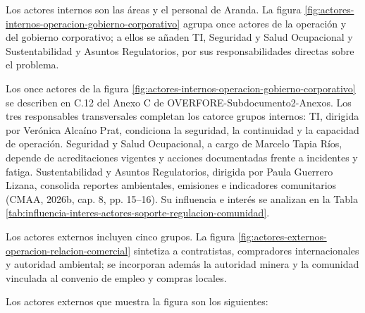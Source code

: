 \documentclass[subdoc]{../../comun/overfore}
\begin{document}
Los actores internos son las áreas y el personal de Aranda. La figura \ref{fig:actores-internos-operacion-gobierno-corporativo} agrupa once actores de la operación y del gobierno corporativo; a ellos se añaden TI, Seguridad y Salud Ocupacional y Sustentabilidad y Asuntos Regulatorios, por sus responsabilidades directas sobre el problema.

Los once actores de la figura \ref{fig:actores-internos-operacion-gobierno-corporativo} se describen en C.12 del Anexo C de OVERFORE-Subdocumento2-Anexos. Los tres responsables transversales completan los catorce grupos internos: TI, dirigida por Verónica Alcaíno Prat, condiciona la seguridad, la continuidad y la capacidad de operación. Seguridad y Salud Ocupacional, a cargo de Marcelo Tapia Ríos, depende de acreditaciones vigentes y acciones documentadas frente a incidentes y fatiga. Sustentabilidad y Asuntos Regulatorios, dirigida por Paula Guerrero Lizana, consolida reportes ambientales, emisiones e indicadores comunitarios (CMAA, 2026b, cap. 8, pp. 15–16). Su influencia e interés se analizan en la Tabla \ref{tab:influencia-interes-actores-soporte-regulacion-comunidad}.

Los actores externos incluyen cinco grupos. La figura \ref{fig:actores-externos-operacion-relacion-comercial} sintetiza a contratistas, compradores internacionales y autoridad ambiental; se incorporan además la autoridad minera y la comunidad vinculada al convenio de empleo y compras locales.

Los actores externos que muestra la figura son los siguientes:
\end{document}
